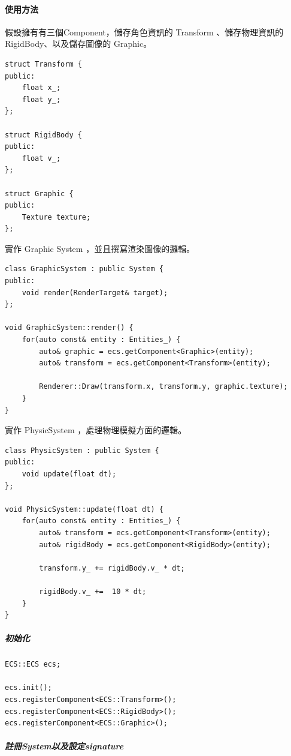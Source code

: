 \paragraph{使用方法}

假設擁有有三個Component，儲存角色資訊的 Transform 、儲存物理資訊的 RigidBody、以及儲存圖像的 Graphic。

\begin{lstlisting}
struct Transform {
public:
    float x_;
    float y_;
};

struct RigidBody {
public:
    float v_;
};

struct Graphic {
public:
    Texture texture;
};
\end{lstlisting}

實作 Graphic System ，並且撰寫渲染圖像的邏輯。

\begin{lstlisting}
class GraphicSystem : public System {
public:
    void render(RenderTarget& target);
};

void GraphicSystem::render() {
    for(auto const& entity : Entities_) {
        auto& graphic = ecs.getComponent<Graphic>(entity);
        auto& transform = ecs.getComponent<Transform>(entity);
        
        Renderer::Draw(transform.x, transform.y, graphic.texture);
    }
}
\end{lstlisting}

實作 PhysicSystem ，處理物理模擬方面的邏輯。

\begin{lstlisting}
class PhysicSystem : public System {
public:
    void update(float dt);
};

void PhysicSystem::update(float dt) {
    for(auto const& entity : Entities_) {
        auto& transform = ecs.getComponent<Transform>(entity);
        auto& rigidBody = ecs.getComponent<RigidBody>(entity);

        transform.y_ += rigidBody.v_ * dt;

        rigidBody.v_ +=  10 * dt;
    }
}
\end{lstlisting}

\subparagraph{初始化}

\begin{lstlisting}
ECS::ECS ecs;

ecs.init();
ecs.registerComponent<ECS::Transform>();
ecs.registerComponent<ECS::RigidBody>();
ecs.registerComponent<ECS::Graphic>();
\end{lstlisting}

\subparagraph{註冊System以及設定signature}

